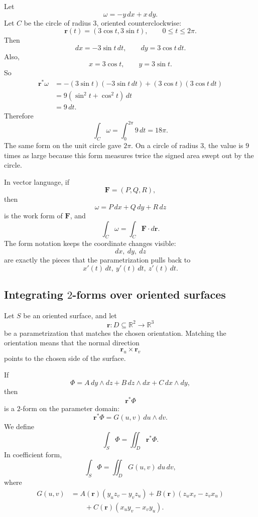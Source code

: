 \begin{example}
Let
\[
    \omega=-y\,dx+x\,dy.
\]
Let \(C\) be the circle of radius \(3\), oriented counterclockwise:
\[
    \mathbf r(t)=(3\cos t,3\sin t),
    \qquad
    0\le t\le2\pi.
\]
Then
\[
    dx=-3\sin t\,dt,
    \qquad
    dy=3\cos t\,dt.
\]
Also,
\[
    x=3\cos t,
    \qquad
    y=3\sin t.
\]
So
\[
\begin{aligned}
    \mathbf r^*\omega
    &=
    -(3\sin t)(-3\sin t\,dt)
    +
    (3\cos t)(3\cos t\,dt)\\
    &=
    9(\sin^2t+\cos^2t)\,dt\\
    &=
    9\,dt.
\end{aligned}
\]
Therefore
\[
\boxed{
    \int_C\omega
    =
    \int_0^{2\pi}9\,dt
    =
    18\pi.
}
\]
The same form on the unit circle gave \(2\pi\).  On a circle of radius \(3\), the value is
\(9\) times as large because this form measures twice the signed area swept out by the
circle.
\end{example}

In vector language, if
\[
    \mathbf F=(P,Q,R),
\]
then
\[
    \omega=P\,dx+Q\,dy+R\,dz
\]
is the work form of \(\mathbf F\), and
\[
    \int_C\omega
    =
    \int_C \mathbf F\cdot d\mathbf r.
\]
The form notation keeps the coordinate changes visible:
\[
    dx,\ dy,\ dz
\]
are exactly the pieces that the parametrization pulls back to
\[
    x'(t)\,dt,\ y'(t)\,dt,\ z'(t)\,dt.
\]

\subsection{Integrating \texorpdfstring{\(2\)}{2}-forms over oriented surfaces}

Let \(S\) be an oriented surface, and let
\[
    \mathbf r:D\subseteq\mathbb R^2\to\mathbb R^3
\]
be a parametrization that matches the chosen orientation.  Matching the orientation
means that the normal direction
\[
    \mathbf r_u\times\mathbf r_v
\]
points to the chosen side of the surface.

If
\[
    \Phi=A\,dy\wedge dz+B\,dz\wedge dx+C\,dx\wedge dy,
\]
then
\[
    \mathbf r^*\Phi
\]
is a \(2\)-form on the parameter domain:
\[
    \mathbf r^*\Phi=G(u,v)\,du\wedge dv.
\]
We define
\[
\boxed{
    \int_S\Phi
    =
    \iint_D \mathbf r^*\Phi.
}
\]
In coefficient form,
\[
\boxed{
    \int_S\Phi
    =
    \iint_D G(u,v)\,du\,dv,
}
\]
where
\[
\begin{aligned}
G(u,v)
&=
A(\mathbf r)(y_u z_v-y_v z_u)
+
B(\mathbf r)(z_u x_v-z_v x_u)\\
&\qquad
+
C(\mathbf r)(x_u y_v-x_v y_u).
\end{aligned}
\]

